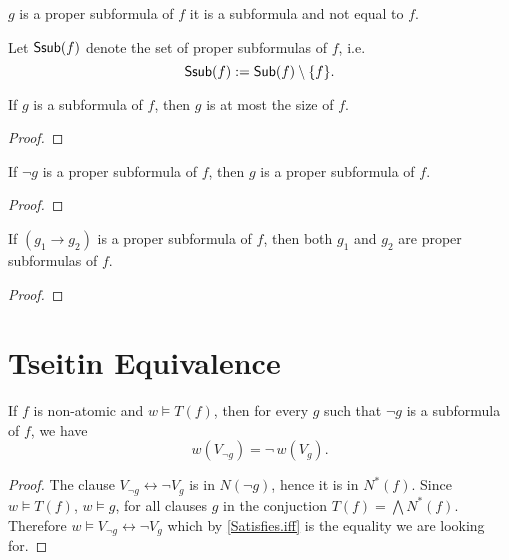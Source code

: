 \begin{definition}
    \label{Ssub}
    \leanok
    $g$ is a proper subformula of $f$ it is a subformula and not equal to $f$.
    
    Let $\mathsf{Ssub}(f)$ denote the set of proper subformulas of $f$, i.e.\
    \[
    \mathsf{Ssub}(f) := \mathsf{Sub}(f) \setminus \{ f \}.
    \]
\end{definition}

\begin{lemma}
    \label{sub_smaller}
    \leanok
    If $g$ is a subformula of $f$, then $g$ is at most the size of $f$.
\end{lemma}
\begin{proof}
    \leanok
\end{proof}

\begin{lemma}
    \label{neg_ssub}
    \leanok
    If $\neg g$ is a proper subformula of $f$, then $g$ is a proper subformula of $f$.
\end{lemma}
\begin{proof}
    \leanok
\end{proof}

\begin{lemma}
    \label{imp_ssub}
    \leanok
    If $(g_1 \to g_2)$ is a proper subformula of $f$, then both $g_1$ and $g_2$ are proper subformulas of $f$.
\end{lemma}
\begin{proof}
    \leanok
\end{proof}

\section{Tseitin Equivalence}

\begin{lemma}
    \label{eval_not}
    \leanok
    If $f$ is non-atomic and $w \models T(f)$, then for every $g$ such that $\neg g$ is a subformula of $f$, we have
    \[
    w(V_{\neg g}) = \neg \, w(V_g).
    \]
\end{lemma}
\begin{proof}
    \leanok
    The clause $V_{\neg g} \leftrightarrow \neg V_g$ is in $N(\neg g)$, hence it is in $N^*(f)$.
    Since $w \models T(f)$, $w \models g$, for all clauses $g$ in the conjuction $T(f) = \bigwedge N^*(f)$.
    Therefore $w \models V_{\neg g} \leftrightarrow \neg V_g$ which by \ref{Satisfies.iff} is the equality we are looking for.
\end{proof}


